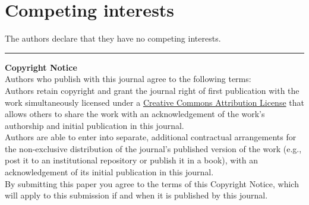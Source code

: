 \documentclass{jors}
\begin{document}
\section{Competing interests}

The authors declare that they have no competing interests.

{}


\vspace{2cm}

\rule{\textwidth}{1pt}

{ \bf Copyright Notice} \\
Authors who publish with this journal agree to the following terms: \\

Authors retain copyright and grant the journal right of first publication with the work simultaneously licensed under a  \href{http://creativecommons.org/licenses/by/3.0/}{Creative Commons Attribution License} that allows others to share the work with an acknowledgement of the work's authorship and initial publication in this journal. \\

Authors are able to enter into separate, additional contractual arrangements for the non-exclusive distribution of the journal's published version of the work (e.g., post it to an institutional repository or publish it in a book), with an acknowledgement of its initial publication in this journal. \\

By submitting this paper you agree to the terms of this Copyright Notice, which will apply to this submission if and when it is published by this journal.
\end{document}
